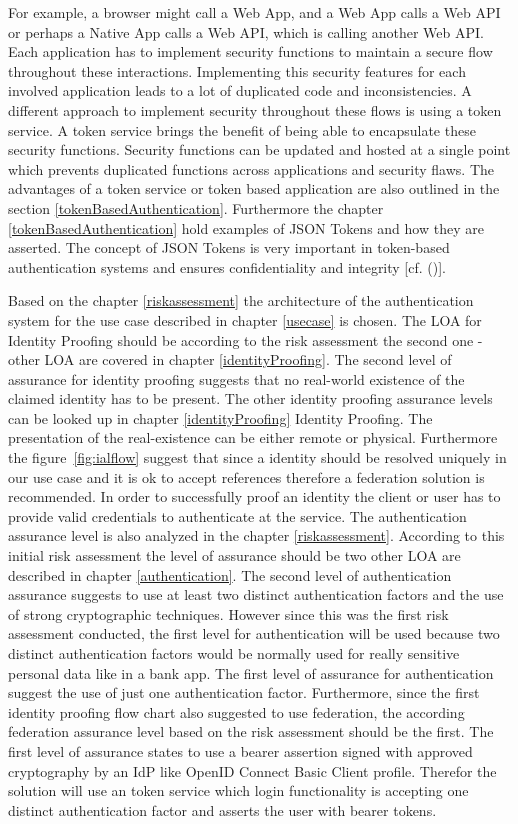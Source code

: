 For example, a browser might call a Web App, and a Web App calls a Web API or perhaps a Native App calls a Web API, which is calling another Web API. Each application has to implement security functions to maintain a secure flow throughout these interactions. Implementing this security features for each involved application leads to a lot of duplicated code and inconsistencies. A different approach to implement security throughout these flows is using a token service. A token service brings the benefit of being able to encapsulate these security functions. Security functions can be updated and hosted at a single point which prevents duplicated functions across applications and security flaws. The advantages of a token service or token based application are also outlined in the section \ref{tokenBasedAuthentication}. Furthermore the chapter \ref{tokenBasedAuthentication} hold examples of JSON Tokens and how they are asserted. The concept of JSON Tokens is very important in token-based authentication systems and ensures confidentiality and integrity [cf. (\cite{Sakimura:2014:OpenIDConnect})].


Based on the chapter \ref{riskassessment} the architecture of the authentication system for the use case described in chapter \ref{usecase} is chosen. The LOA for Identity Proofing should be according to the risk assessment the second one - other LOA are covered in chapter \ref{identityProofing}. The second level of assurance for identity proofing suggests that no real-world existence of the claimed identity has to be present. The other identity proofing assurance levels can be looked up in chapter \ref{identityProofing} Identity Proofing. The presentation of the real-existence can be either remote or physical. Furthermore the figure~\ref{fig:ialflow} suggest that since a identity should be resolved uniquely in our use case and it is ok to accept references therefore a federation solution is recommended. In order to successfully proof an identity the client or user has to provide valid credentials to authenticate at the service. The  authentication assurance level is also analyzed in the chapter \ref{riskassessment}. According to this initial risk assessment the level of assurance should be two other LOA are described in chapter \ref{authentication}. The second level of authentication assurance suggests to use at least two distinct authentication factors and the use of strong cryptographic techniques. However since this was the first risk assessment conducted, the first level for authentication will be used because two distinct authentication factors would be normally used for really sensitive personal data like in a bank app. The first level of assurance for authentication suggest the use of just one authentication factor. Furthermore, since the first identity proofing flow chart also suggested to use federation, the according federation assurance level based on the risk assessment should be the first. The first level of assurance states to use a bearer assertion signed with approved cryptography by an IdP like OpenID Connect Basic Client profile. Therefor the solution will use an token service which login functionality is  accepting one distinct authentication factor and asserts the user with bearer tokens. 


